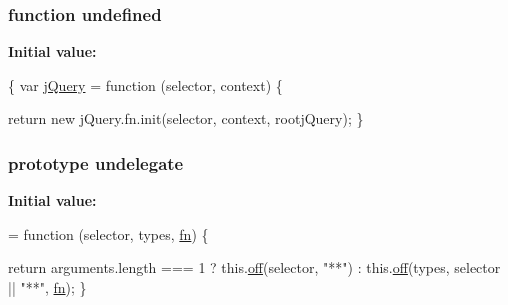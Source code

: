 \subsubsection[{\texorpdfstring{undefined}{undefined}}]{\setlength{\rightskip}{0pt plus 5cm}function undefined}\hypertarget{jquery-2_82_81-vsdoc_8js_a08113a236cc18d2a9d5ce27e638012be}{}\label{jquery-2_82_81-vsdoc_8js_a08113a236cc18d2a9d5ce27e638012be}
{\bfseries Initial value\+:}
\begin{DoxyCode}
\{
    var \hyperlink{jquery-2_82_81-vsdoc_8js_add5237586d970a38a81f990e8eb28c6c}{jQuery} = \textcolor{keyword}{function} (selector, context) \{
        

        
        \textcolor{keywordflow}{return} \textcolor{keyword}{new} jQuery.fn.init(selector, context, rootjQuery);
    \}
\end{DoxyCode}
\subsubsection[{\texorpdfstring{undelegate}{undelegate}}]{ {\bf prototype} undelegate}\hypertarget{jquery-2_82_81-vsdoc_8js_adf3212944c5742602d54b599a05f0746}{}\label{jquery-2_82_81-vsdoc_8js_adf3212944c5742602d54b599a05f0746}
{\bfseries Initial value\+:}
\begin{DoxyCode}
= \textcolor{keyword}{function} (selector, types, \hyperlink{jquery-2_82_81-vsdoc_8js_acef6bdaf6b9b20fdcca1ea86f0902c3b}{fn}) \{
        

        
        \textcolor{keywordflow}{return} arguments.length === 1 ? this.\hyperlink{jquery-2_82_81-vsdoc_8js_abd3345ae76b0b1425e11cd916e7bc97c}{off}(selector, \textcolor{stringliteral}{"**"}) : this.\hyperlink{jquery-2_82_81-vsdoc_8js_abd3345ae76b0b1425e11cd916e7bc97c}{off}(types, selector || \textcolor{stringliteral}{"**"}, 
      \hyperlink{jquery-2_82_81-vsdoc_8js_acef6bdaf6b9b20fdcca1ea86f0902c3b}{fn});
    \}
\end{DoxyCode}
